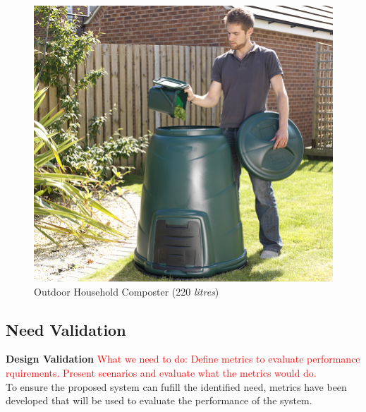 \documentclass[a4paper,11pt,fleqn]{report}
\begin{document}
\begin{figure}[h!]
\begin{center}
\includegraphics[scale = 1.1]{Outdoor_Composter.jpg}
\caption{Outdoor Household Composter (220 \textit{litres})}
\label{fig: Outdoor Composter}
\end{center}
\end{figure}

\subsection{Need Validation}
\textbf{Design Validation}
\textcolor{red}{What we need to do: Define metrics to evaluate performance rquirements. Present scenarios and evaluate what the metrics would do.}\\

To ensure the proposed system can fufill the identified need, metrics have been developed that will be used to evaluate the performance of the system.
\end{document}
